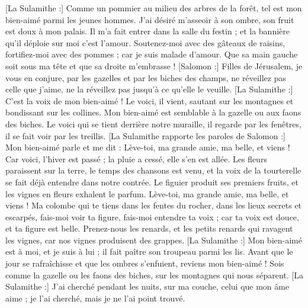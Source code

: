 \begin{multicols}{2}
[La Sulamithe :] Comme un pommier au milieu des arbres de la forêt, tel est mon bien-aimé parmi les jeunes hommes. J'ai désiré m’asseoir à son ombre, son fruit est doux à mon palais.
Il m'a fait entrer dans la salle du festin ; et la bannière qu’il déploie sur moi c’est l’amour.
Soutenez-moi avec des gâteaux de raisins, fortifiez-moi avec des pommes ; car je suis malade d'amour.
Que sa main gauche soit sous ma tête et que sa droite m'embrasse !
[Salomon :] Filles de Jérusalem, je vous en conjure, par les gazelles et par les biches des champs, ne réveillez pas celle que j'aime, ne la réveillez pas jusqu'à ce qu'elle le veuille.
[La Sulamithe :] C'est la voix de mon bien-aimé ! Le voici, il vient, sautant sur les montagnes et bondissant sur les collines.
Mon bien-aimé est semblable à la gazelle ou aux faons des biches. Le voici qui se tient derrière notre muraille, il regarde par les fenêtres, il se fait voir par les treillis.
[La Sulamithe rapporte les paroles de Salomon :] Mon bien-aimé parle et me dit : Lève-toi, ma grande amie, ma belle, et viens !
Car voici, l'hiver est passé ; la pluie a cessé, elle s'en est allée.
Les fleurs paraissent sur la terre, le temps des chansons est venu, et la voix de la tourterelle se fait déjà entendre dans notre contrée.
Le figuier produit ses premiers fruits, et les vignes en fleurs exhalent le parfum. Lève-toi, ma grande amie, ma belle, et viens !
Ma colombe qui te tiens dans les fentes du rocher, dans les lieux secrets et escarpés, fais-moi voir ta figure, fais-moi entendre ta voix ; car ta voix est douce, et ta figure est belle.
Prenez-nous les renards, et les petits renards qui ravagent les vignes, car nos vignes produisent des grappes.
[La Sulamithe :] Mon bien-aimé est à moi, et je suis à lui ; il fait paître son troupeau parmi les lis.
Avant que le jour se rafraîchisse et que les ombres s'enfuient, reviens mon bien-aimé ! Sois comme la gazelle ou les faons des biches, sur les montagnes qui nous séparent.
\VerseOne{}[La Sulamithe :] J'ai cherché pendant les nuits, sur ma couche, celui que mon âme aime ; je l'ai cherché, mais je ne l'ai point trouvé.

\end{multicols}
